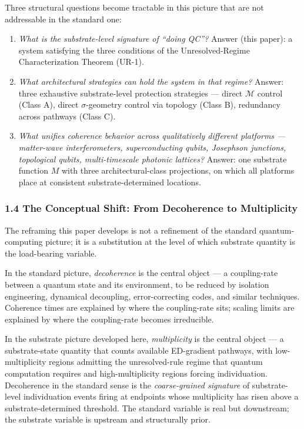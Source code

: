 \documentclass[
  11pt,
  a4paper,
]{article}
\begin{document}
Three structural questions become tractable in this picture that are not
addressable in the standard one:

\begin{enumerate}
\def\labelenumi{\arabic{enumi}.}
\item
  \emph{What is the substrate-level signature of ``doing QC''?} Answer
  (this paper): a system satisfying the three conditions of the
  Unresolved-Regime Characterization Theorem (UR-1).
\item
  \emph{What architectural strategies can hold the system in that
  regime?} Answer: three exhaustive substrate-level protection
  strategies --- direct \(\mathcal{M}\) control (Class A), direct
  \(\sigma\)-geometry control via topology (Class B), redundancy across
  pathways (Class C).
\item
  \emph{What unifies coherence behavior across qualitatively different
  platforms --- matter-wave interferometers, superconducting qubits,
  Josephson junctions, topological qubits, multi-timescale photonic
  lattices?} Answer: one substrate function \(M\) with three
  architectural-class projections, on which all platforms place at
  consistent substrate-determined locations.
\end{enumerate}

\subsubsection{1.4 The Conceptual Shift: From Decoherence to
Multiplicity}\label{the-conceptual-shift-from-decoherence-to-multiplicity}

The reframing this paper develops is not a refinement of the standard
quantum-computing picture; it is a substitution at the level of which
substrate quantity is the load-bearing variable.

In the standard picture, \emph{decoherence} is the central object --- a
coupling-rate between a quantum state and its environment, to be reduced
by isolation engineering, dynamical decoupling, error-correcting codes,
and similar techniques. Coherence times are explained by where the
coupling-rate sits; scaling limits are explained by where the
coupling-rate becomes irreducible.

In the substrate picture developed here, \emph{multiplicity} is the
central object --- a substrate-state quantity that counts available
ED-gradient pathways, with low-multiplicity regions admitting the
unresolved-rule regime that quantum computation requires and
high-multiplicity regions forcing individuation. Decoherence in the
standard sense is the \emph{coarse-grained signature} of substrate-level
individuation events firing at endpoints whose multiplicity has risen
above a substrate-determined threshold. The standard variable is real
but downstream; the substrate variable is upstream and structurally
prior.
\end{document}
